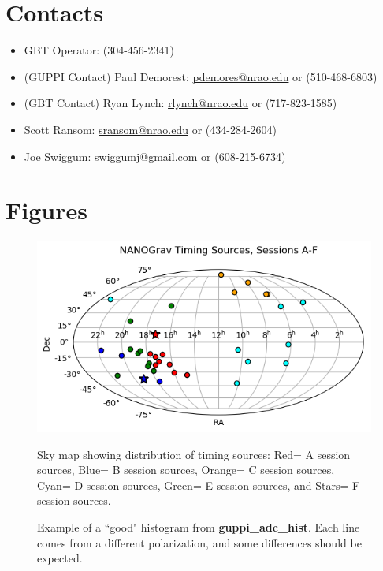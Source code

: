 \documentclass[11pt, reqno, tbtags]{article}
\begin{document}
\section{Contacts}\label{sec:con}  %
\begin{itemize}
 \item GBT Operator: (304-456-2341)
 \item (GUPPI Contact) Paul Demorest: \href{mailto:pdemores@nrao.edu}{pdemores@nrao.edu} or (510-468-6803)
 \item (GBT Contact) Ryan Lynch: \href{mailto:rlynch@nrao.edu}{rlynch@nrao.edu} or (717-823-1585)
 \item Scott Ransom: \href{mailto:sransom@nrao.edu}{sransom@nrao.edu} or (434-284-2604)
 \item Joe Swiggum: \href{mailto:swiggumj@gmail.com}{swiggumj@gmail.com} or (608-215-6734)
\end{itemize}



\newpage
\section{Figures}  %
\vspace{1cm}

\begin{figure}[h]
 \centering
  {\includegraphics{nanograv_timing_sessions_12-2017.png}}
  \caption{Sky map showing distribution of timing sources: Red= A session sources, Blue= B session sources, Orange= C session sources, Cyan= D session sources, Green= E session sources, and Stars= F session sources.}
  \label{fig:map}
\end{figure}


\begin{figure}[h]
 \centering
  \caption{Example of a ``good" histogram from \textbf{guppi\_adc\_hist}.  Each line comes from a different polarization, and some differences should be expected.}  
  \label{fig:gah}
\end{figure}
\end{document}
